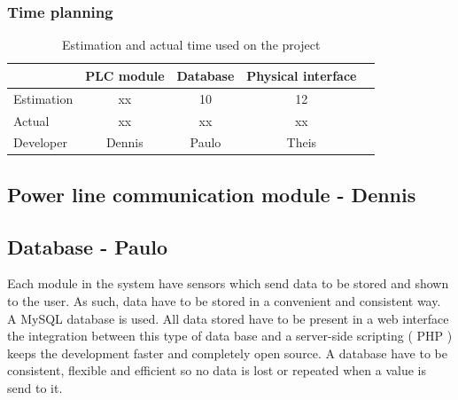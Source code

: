 \subsubsection{Time planning}
\begin{table}[H]
\centering
	\begin{tabular}{|l|c|c|c|c|}
		\hline
		~			& PLC module	& Database	& Physical interface\\ \hline
		Estimation	& xx			& 10		& 12				\\
		Actual		& xx			& xx		& xx				\\
		Developer	& Dennis		& Paulo		& Theis				\\
		\hline
	\end{tabular}
	\caption{Estimation and actual time used on the project}
\end{table}
\subsection{Power line communication module - Dennis}
%			
%					
%	
%	
%	
%	
%	
%	
%	
\subsection{Database - Paulo}

Each module in the system have sensors which send data to be stored and shown to the user. As such, data have to be stored in a convenient and consistent way. A MySQL database is used. All data stored have to be present in a web interface the integration between this type of data base and a server-side scripting ( PHP ) keeps the development faster and completely open source.
A database have to be consistent, flexible and efficient so no data is lost or repeated when a value is send to it.
%
